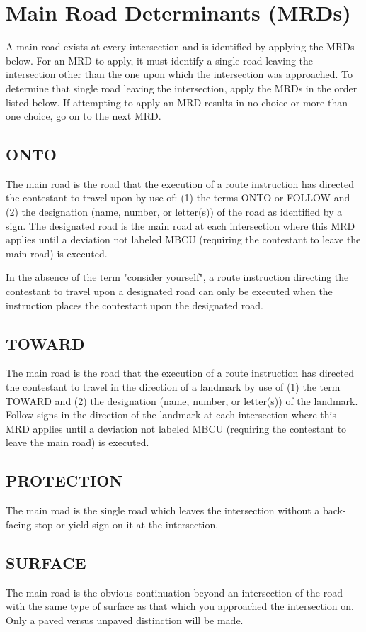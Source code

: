 \section{Main Road Determinants (MRDs)}
\label{sec:mrd} A main road exists at every intersection and is identified by applying the MRDs below.  For an MRD to apply, it must identify a single road leaving the intersection other than the one upon which the intersection was approached.  To determine that single road leaving the intersection, apply the MRDs in the order listed below.  If attempting to apply an MRD results in no choice or more than one choice, go on to the next MRD.

\subsection{ONTO}
The main road is the road that the execution of a route instruction has directed the contestant to travel upon by use of: (1) the terms ONTO or FOLLOW and (2) the designation (name, number, or letter(s)) of the road as identified by a sign.  The designated road is the main road at each intersection where this MRD applies until a deviation not labeled MBCU (requiring the contestant to leave the main road) is executed.

In the absence of the term "consider yourself", a route instruction directing the contestant to travel upon a designated road can only be executed when the instruction places the contestant upon the designated road.

\subsection{TOWARD}
The main road is the road that the execution of a route instruction has directed the contestant to travel in the direction of a landmark by use of (1) the term TOWARD and (2) the designation (name, number, or letter(s)) of the landmark.  Follow signs in the direction of the landmark at each intersection where this MRD applies until a deviation not labeled MBCU (requiring the contestant to leave the main road) is executed.

\subsection{PROTECTION}
The main road is the single road which leaves the intersection without a back-facing stop or yield sign on it at the intersection.

\subsection{SURFACE}
The main road is the obvious continuation beyond an intersection of the road with the same type of surface as that which you approached the intersection on.  Only a paved versus unpaved distinction will be made.

